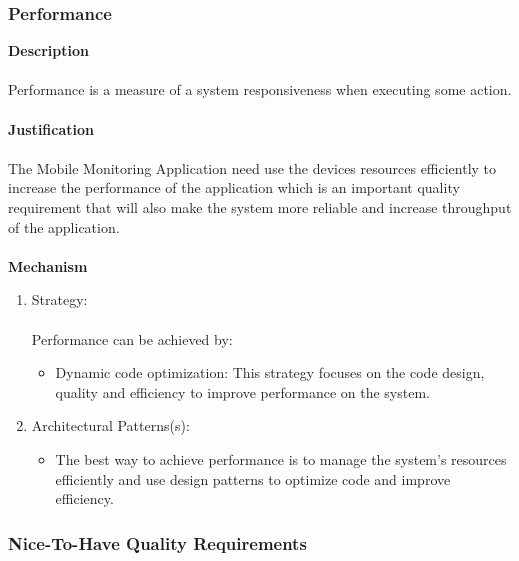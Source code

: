 \documentclass[hidelinks, 12pt, oneside]{article}
\begin{document}
			\subsubsection*{Performance}
			\textbf{Description}\\\\
			Performance is a measure of a system responsiveness when executing some action.\\\\
			\textbf{Justification}\\\\
			The Mobile Monitoring Application need use the devices resources efficiently to increase the performance of the application which is an important quality requirement that will also make the system more reliable and increase throughput of the application.\\\\
			\textbf{Mechanism}
			\begin{enumerate}
				\item Strategy:\\\\
				Performance can be achieved by:
				\begin{itemize}
				\item Dynamic code optimization: This strategy focuses on the code design, quality and efficiency to improve performance on the system.  
				\end{itemize}
				\item Architectural Patterns(s):
				\begin{itemize}
				\item The best way to achieve performance is to manage the system's resources efficiently and use design patterns to optimize code and improve efficiency.   
				\end{itemize}
			\end{enumerate}	
			
		\newpage
		\subsubsection{Nice-To-Have Quality Requirements}
\end{document}
